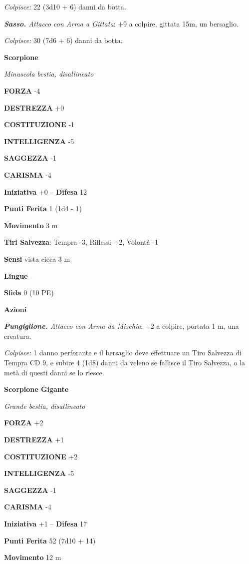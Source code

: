 \begin{multicols}{2}
\emph{Colpisce:} 22 (3d10 + 6) danni da botta.

\emph{\textbf{Sasso.} Attacco con Arma a Gittata}: +9 a colpire, gittata 15m, un bersaglio.

\emph{Colpisce:} 30 (7d6 + 6) danni da botta.

\medskip\textbf{Scorpione}

\emph{Minuscola bestia, disallineato}

\textbf{FORZA} -4

\textbf{DESTREZZA} +0

\textbf{COSTITUZIONE} -1

\textbf{INTELLIGENZA} -5

\textbf{SAGGEZZA} -1

\textbf{CARISMA} -4

\textbf{Iniziativa} +0 -- \textbf{Difesa} 12

\textbf{Punti Ferita} 1 (1d4 - 1)

\textbf{Movimento} 3 m

\textbf{Tiri Salvezza}: Tempra -3, Riflessi +2, Volontà -1

\textbf{Sensi} vista cieca 3 m

\textbf{Lingue} -

\textbf{Sfida} 0 (10 PE)

\textbf{Azioni}

\emph{\textbf{Pungiglione.} Attacco con Arma da Mischia}: +2 a colpire, portata 1 m, una creatura.

\emph{Colpisce:} 1 danno perforante e il bersaglio deve effettuare un Tiro Salvezza di Tempra CD 9, e subire 4 (1d8) danni da veleno se fallisce il Tiro Salvezza, o la metà di questi danni se lo riesce.

\medskip\textbf{Scorpione Gigante}

\emph{Grande bestia, disallineato}

\textbf{FORZA} +2

\textbf{DESTREZZA} +1

\textbf{COSTITUZIONE} +2

\textbf{INTELLIGENZA} -5

\textbf{SAGGEZZA} -1

\textbf{CARISMA} -4

\textbf{Iniziativa} +1 -- \textbf{Difesa} 17

\textbf{Punti Ferita} 52 (7d10 + 14)

\textbf{Movimento} 12 m


\end{multicols}
